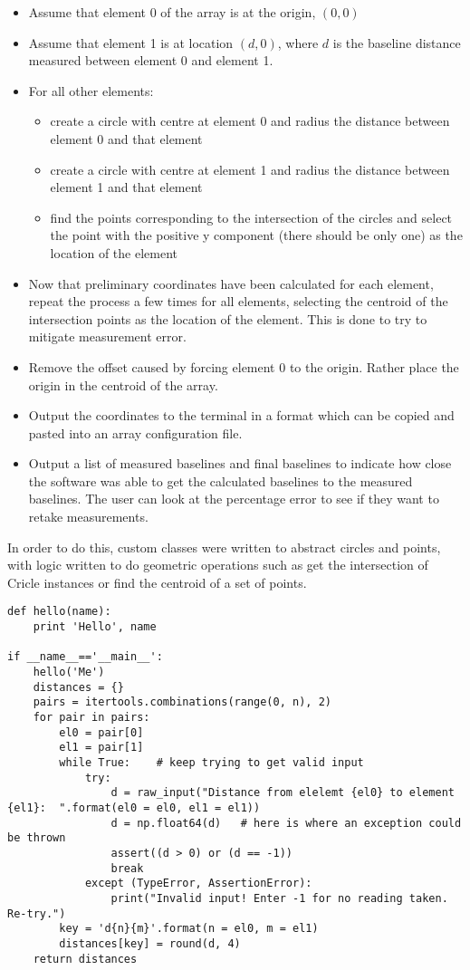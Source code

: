 \begin{itemize}
  \item Assume that element 0 of the array is at the origin, \((0, 0)\)
  \item Assume that element 1 is at location \((d, 0)\), where \(d\) is the baseline distance measured between element 0 and element 1.
  \item For all other elements:
    \begin{itemize}
      \item create a circle with centre at element 0 and radius the distance between element 0 and that element
      \item create a circle with centre at element 1 and radius the distance between element 1 and that element
      \item find the points corresponding to the intersection of the circles and select the point with the positive y component (there should be only one) as the location of the element
    \end{itemize}
  \item Now that preliminary coordinates have been calculated for each element, repeat the process a few times for all elements, selecting the centroid of the intersection points as the location of the element. This is done to try to mitigate measurement error.
  \item Remove the offset caused by forcing element 0 to the origin. Rather place the origin in the centroid of the array.
  \item Output the coordinates to the terminal in a format which can be copied and pasted into an array configuration file. 
  \item Output a list of measured baselines and final baselines to indicate how close the software was able to get the calculated baselines to the measured baselines. The user can look at the percentage error to see if they want to retake measurements.
\end{itemize}

In order to do this, custom classes were written to abstract circles and points, with logic written to do geometric operations such as get the intersection of Cricle instances or find the centroid of a set of points. 

\begin{lstlisting}
def hello(name):
    print 'Hello', name
 
if __name__=='__main__':
    hello('Me')    
    distances = {}
    pairs = itertools.combinations(range(0, n), 2)
    for pair in pairs:
        el0 = pair[0]
        el1 = pair[1]
        while True:    # keep trying to get valid input
            try:
                d = raw_input("Distance from elelemt {el0} to element {el1}:  ".format(el0 = el0, el1 = el1))
                d = np.float64(d)   # here is where an exception could be thrown
                assert((d > 0) or (d == -1))
                break
            except (TypeError, AssertionError):
                print("Invalid input! Enter -1 for no reading taken. Re-try.")
        key = 'd{n}{m}'.format(n = el0, m = el1)
        distances[key] = round(d, 4)
    return distances

\end{lstlisting}

